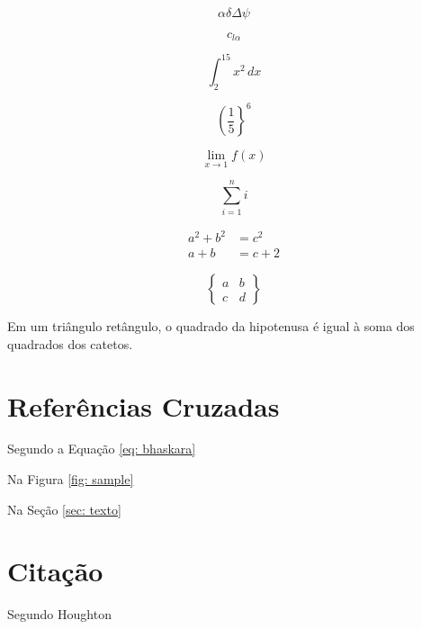 \[ \alpha \delta \Delta \psi \]

\[ c_{l\alpha} \]

\[ \int_2^{15} x^2\,dx \]

\[ \left(\frac{1}{5}\right\}^6 \]

\[ \lim_{x \to 1} f(x) \]

\[ \sum_{i=1}^n i \]

\begin{align}
a^2 + b^2 &= c^2 \\
a+b &= c + 2
\end{align}

\begin{equation}
\begin{Bmatrix}
a & b\\
c & d
\end{Bmatrix}
\end{equation}

\begin{theorem}
Em um triângulo retângulo, o quadrado da hipotenusa é igual à soma dos quadrados dos catetos.
\end{theorem}

\section{Referências Cruzadas}

Segundo a Equação \ref{eq: bhaskara}

Na Figura \ref{fig: sample}

Na Seção \ref{sec: texto}

\section{Citação}

Segundo Houghton \cite{houghton}

\begin{table}[H]
\centering
\caption{Valores calculados de módulo de impulso sofrido (I), energia cinética e quantidade de movimento (P).}
\label{tab:4}
\end{table}